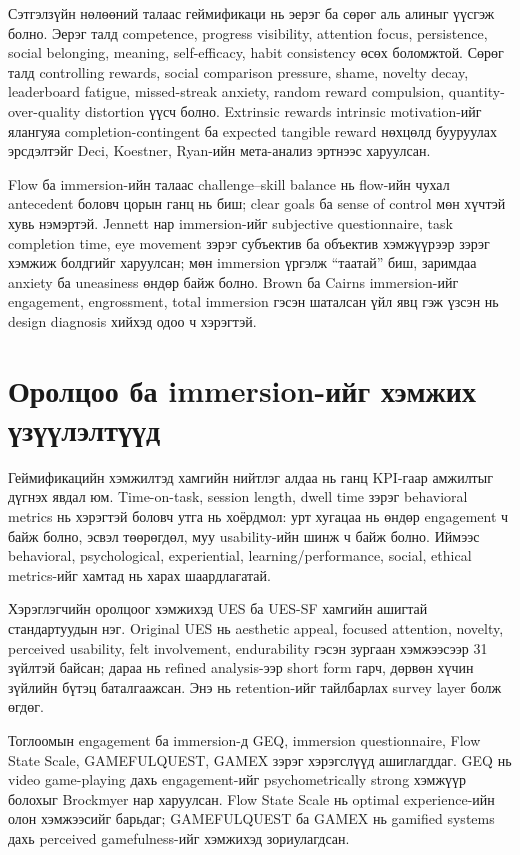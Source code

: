 \begin{sloppy}
Сэтгэлзүйн нөлөөний талаас геймификаци нь эерэг ба сөрөг аль алиныг үүсгэж болно. Эерэг талд competence, progress visibility, attention focus, persistence, social belonging, meaning, self-efficacy, habit consistency өсөх боломжтой. Сөрөг талд controlling rewards, social comparison pressure, shame, novelty decay, leaderboard fatigue, missed-streak anxiety, random reward compulsion, quantity-over-quality distortion үүсч болно. Extrinsic rewards intrinsic motivation-ийг ялангуяа completion-contingent ба expected tangible reward нөхцөлд бууруулах эрсдэлтэйг Deci, Koestner, Ryan-ийн мета-анализ эртнээс харуулсан.

Flow ба immersion-ийн талаас challenge--skill balance нь flow-ийн чухал antecedent боловч цорын ганц нь биш; clear goals ба sense of control мөн хүчтэй хувь нэмэртэй. Jennett нар immersion-ийг subjective questionnaire, task completion time, eye movement зэрэг субъектив ба объектив хэмжүүрээр зэрэг хэмжиж болдгийг харуулсан; мөн immersion үргэлж ``таатай'' биш, заримдаа anxiety ба uneasiness өндөр байж болно. Brown ба Cairns immersion-ийг engagement, engrossment, total immersion гэсэн шаталсан үйл явц гэж үзсэн нь design diagnosis хийхэд одоо ч хэрэгтэй.

\section*{Оролцоо ба immersion-ийг хэмжих үзүүлэлтүүд}

Геймификацийн хэмжилтэд хамгийн нийтлэг алдаа нь ганц KPI-гаар амжилтыг дүгнэх явдал юм. Time-on-task, session length, dwell time зэрэг behavioral metrics нь хэрэгтэй боловч утга нь хоёрдмол: урт хугацаа нь өндөр engagement ч байж болно, эсвэл төөрөгдөл, муу usability-ийн шинж ч байж болно. Иймээс behavioral, psychological, experiential, learning/performance, social, ethical metrics-ийг хамтад нь харах шаардлагатай.

Хэрэглэгчийн оролцоог хэмжихэд UES ба UES-SF хамгийн ашигтай стандартуудын нэг. Original UES нь aesthetic appeal, focused attention, novelty, perceived usability, felt involvement, endurability гэсэн зургаан хэмжээсээр 31 зүйлтэй байсан; дараа нь refined analysis-ээр short form гарч, дөрвөн хүчин зүйлийн бүтэц баталгаажсан. Энэ нь retention-ийг тайлбарлах survey layer болж өгдөг.

Тоглоомын engagement ба immersion-д GEQ, immersion questionnaire, Flow State Scale, GAMEFULQUEST, GAMEX зэрэг хэрэгслүүд ашиглагддаг. GEQ нь video game-playing дахь engagement-ийг psychometrically strong хэмжүүр болохыг Brockmyer нар харуулсан. Flow State Scale нь optimal experience-ийн олон хэмжээсийг барьдаг; GAMEFULQUEST ба GAMEX нь gamified systems дахь perceived gamefulness-ийг хэмжихэд зориулагдсан.


\end{sloppy}
